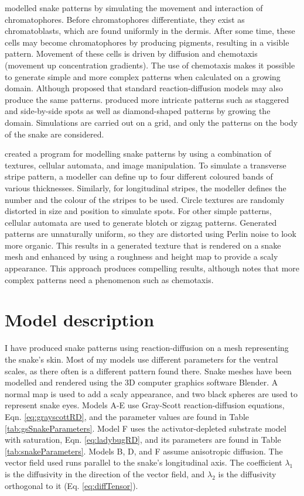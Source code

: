 \citet{murray1991} modelled snake patterns by simulating the movement and interaction of chromatophores. Before chromatophores differentiate, they exist as chromatoblasts, which are found uniformly in the dermis. After some time, these cells may become chromatophores by producing pigments, resulting in a visible pattern. Movement of these cells is driven by diffusion and chemotaxis (movement up concentration gradients). The use of chemotaxis makes it possible to generate simple and more complex patterns when calculated on a growing domain. Although \citet{murray1991} proposed that standard reaction-diffusion models may also produce the same patterns. \citet{murray1991} produced more intricate patterns such as staggered and side-by-side spots as well as diamond-shaped patterns by growing the domain. Simulations are carried out on a grid, and only the patterns on the body of the snake are considered.

\citet{pinheiro2017} created a program for modelling snake patterns by using a combination of textures, cellular automata, and image manipulation. To simulate a transverse stripe pattern, a modeller can define up to four different coloured bands of various thicknesses. Similarly, for longitudinal stripes, the modeller defines the number and the colour of the stripes to be used. Circle textures are randomly distorted in size and position to simulate spots. For other simple patterns, cellular automata are used to generate blotch or zigzag patterns. Generated patterns are unnaturally uniform, so they are distorted using Perlin noise to look more organic. This results in a generated texture that is rendered on a snake mesh and enhanced by using a roughness and height map to provide a scaly appearance. This approach produces compelling results, although \citet{pinheiro2017} notes that more complex patterns need a phenomenon such as chemotaxis.

\section{Model description}
I have produced snake patterns using reaction-diffusion on a mesh representing the snake's skin. Most of my models use different parameters for the ventral scales, as there often is a different pattern found there. Snake meshes have been modelled and rendered using the 3D computer graphics software Blender. A normal map is used to add a scaly appearance, and two black spheres are used to represent snake eyes. Models A-E use Gray-Scott reaction-diffusion equations, Eqn. \ref{eq:grayscottRD}, and the parameter values are found in Table \ref{tab:gsSnakeParameters}. Model F uses the activator-depleted substrate model with saturation, Eqn. \ref{eq:ladybugRD}, and its parameters are found in Table \ref{tab:snakeParameters}. Models B, D, and F assume anisotropic diffusion. The vector field used runs parallel to the snake's longitudinal axis. The coefficient $\lambda_{1}$ is the diffusivity in the direction of the vector field, and $\lambda_{2}$ is the diffusivity orthogonal to it (Eq. \ref{eq:diffTensor}). 

